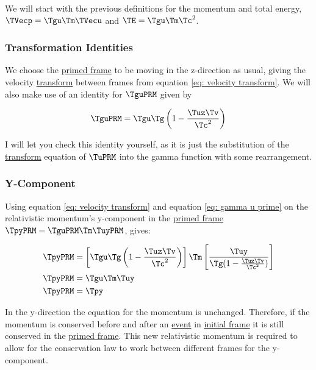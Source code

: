 \begin{derivation}

We will start with the previous definitions for the momentum and total energy, $\TVecp  = \Tgu  \Tm  \TVecu $ and $\TE  = \Tgu  \Tm  \Tc ^2$.

\subsubsection{Transformation Identities}

We choose the \hyperlink{def-Primed-Frame}{primed frame} to be moving in the z-direction as usual, giving the velocity \hyperlink{def-transform}{transform} between frames from equation \eqref{eq: velocity transform}.
We will also make use of an identity for $\TguPRM $ given by

\begin{equation}
	\label{eq: gamma u prime}
	\TguPRM  = \Tgu  \Tg  \left(1 - \frac{\Tuz  \Tv }{\Tc ^2}\right)
\end{equation}

I will let you check this identity yourself, as it is just the substitution of the \hyperlink{def-transform}{transform} equation of $\TuPRM $ into the gamma function with some rearrangement.

\subsubsection{Y-Component}

Using equation \eqref{eq: velocity transform} and equation \eqref{eq: gamma u prime} on the relativistic momentum's y-component in the \hyperlink{def-Primed-Frame}{primed frame} $\TpyPRM  = \TguPRM  \Tm  \TuyPRM $, gives:

\begin{equation}
	\begin{aligned}
		\TpyPRM  &= \left[ \Tgu  \Tg  \left(1 - \frac{\Tuz  \Tv }{\Tc ^2}\right) \right] \Tm  \left[ \frac{\Tuy }{\Tg (1 - \frac{\Tuz  \Tv }{\Tc ^2})} \right] \\
		\TpyPRM  &= \Tgu  \Tm  \Tuy   \\
		\TpyPRM  &= \Tpy
	\end{aligned}
\end{equation}

In the y-direction the equation for the momentum is unchanged.
Therefore, if the momentum is conserved before and after an \hyperlink{def-event}{event} in \hyperlink{def-initial-Frame}{initial frame} it is still conserved in the \hyperlink{def-Primed-Frame}{primed frame}.
This new relativistic momentum is required to allow for the conservation law to work between different frames for the y-component.


\end{derivation}
